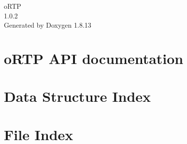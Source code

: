 \documentclass[twoside]{book}
\newcommand{\+}{\discretionary{\mbox{\scriptsize$\hookleftarrow$}}{}{}}
\newcommand{\clearemptydoublepage}{%
  \newpage{\pagestyle{empty}\cleardoublepage}%
}
\begin{document}
\begin{titlepage}
\vspace*{7cm}
\begin{center}%
{\Large o\+R\+TP \\[1ex]\large 1.\+0.\+2 }\\
\vspace*{1cm}
{\large Generated by Doxygen 1.8.13}\\
\end{center}
\end{titlepage}
\clearemptydoublepage
{}
\tableofcontents
\clearemptydoublepage
{}

\chapter{o\+R\+TP A\+PI documentation}
\label{index}
\chapter{Data Structure Index}

\chapter{File Index}

\end{document}
